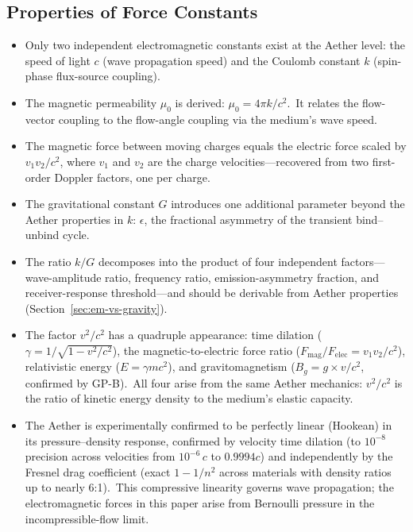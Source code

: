 ﻿\documentclass[12pt,letterpaper]{article}
\begin{document}
\subsection{Properties of Force Constants}

\begin{itemize}[leftmargin=2em]
  \item Only two independent electromagnetic constants exist at the Aether level: the speed of
    light $c$ (wave propagation speed) and the Coulomb constant $k$ (spin-phase
    flux-source coupling).
  \item The magnetic permeability $\mu_0$ is derived: $\mu_0 = 4\pi k/c^2$.\ It relates the
    flow-vector coupling to the flow-angle coupling via the medium's wave speed.
  \item The magnetic force between moving charges equals the electric force scaled by
    $v_1 v_2/c^2$, where $v_1$ and $v_2$ are the charge velocities---recovered from
    two first-order Doppler factors, one per charge.
  \item The gravitational constant $G$ introduces one additional parameter beyond the Aether
    properties in $k$: $\epsilon$, the fractional asymmetry of the transient bind--unbind cycle.
  \item The ratio $k/G$ decomposes into the product of four independent factors---wave-amplitude ratio, frequency ratio, emission-asymmetry fraction, and receiver-response threshold---and should be derivable from Aether properties (Section~\ref{sec:em-vs-gravity}).
  \item The factor $v^2/c^2$ has a quadruple appearance: time dilation ($\gamma = 1/\sqrt{1 - v^2/c^2}$),
    the magnetic-to-electric force ratio ($F_{\mathrm{mag}}/F_{\mathrm{elec}} = v_1 v_2/c^2$), relativistic
    energy ($E = \gamma mc^2$), and gravitomagnetism ($B_g = g \times v/c^2$, confirmed by GP-B).\ All four arise from the same Aether mechanics: $v^2/c^2$ is
    the ratio of kinetic energy density to the medium's elastic capacity.
  \item The Aether is experimentally confirmed to be perfectly linear (Hookean) in its
    pressure--density response, confirmed by velocity time dilation (to $10^{-8}$ precision
    across velocities from $10^{-6}\,c$ to $0.9994c$) and independently by the Fresnel drag
    coefficient (exact $1 - 1/n^2$ across materials with density ratios up to nearly 6:1).\
    This compressive linearity governs wave propagation; the electromagnetic
    forces in this paper arise from Bernoulli pressure in the
    incompressible-flow limit.

\end{itemize}
\end{document}

